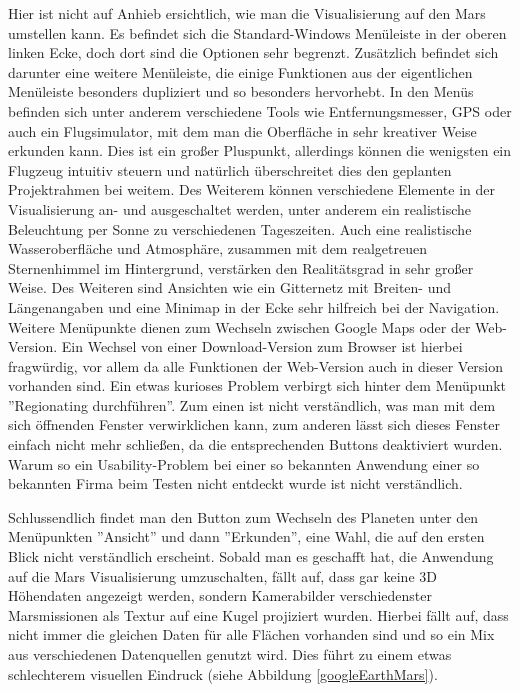 Hier ist nicht auf Anhieb ersichtlich, wie man die Visualisierung auf den Mars umstellen kann. Es befindet sich die Standard-Windows Menüleiste in der oberen linken Ecke, doch dort sind die Optionen sehr begrenzt. Zusätzlich befindet sich darunter eine weitere Menüleiste, die einige Funktionen aus der eigentlichen Menüleiste besonders dupliziert und so besonders hervorhebt. In den Menüs befinden sich unter anderem verschiedene Tools wie Entfernungsmesser, GPS oder auch ein Flugsimulator, mit dem man die Oberfläche in sehr kreativer Weise erkunden kann. Dies ist ein großer Pluspunkt, allerdings können die wenigsten ein Flugzeug intuitiv steuern und natürlich überschreitet dies den geplanten Projektrahmen bei weitem. Des Weiterem können verschiedene Elemente in der Visualisierung an- und ausgeschaltet werden, unter anderem ein realistische Beleuchtung per Sonne zu verschiedenen Tageszeiten. Auch eine realistische Wasseroberfläche und Atmosphäre, zusammen mit dem realgetreuen Sternenhimmel im Hintergrund, verstärken den Realitätsgrad in sehr großer Weise. Des Weiteren sind Ansichten wie ein Gitternetz mit Breiten- und Längenangaben und eine Minimap in der Ecke sehr hilfreich bei der Navigation. Weitere Menüpunkte dienen zum Wechseln zwischen Google Maps oder der Web-Version. Ein Wechsel von einer Download-Version zum Browser ist hierbei fragwürdig, vor allem da alle Funktionen der Web-Version auch in dieser Version vorhanden sind. Ein etwas kurioses Problem verbirgt sich hinter dem Menüpunkt ''Regionating durchführen''. Zum einen ist nicht verständlich, was man mit dem sich öffnenden Fenster verwirklichen kann, zum anderen lässt sich dieses Fenster einfach nicht mehr schließen, da die entsprechenden Buttons deaktiviert wurden. Warum so ein Usability-Problem bei einer so bekannten Anwendung einer so bekannten Firma beim Testen nicht entdeckt wurde ist nicht verständlich.

Schlussendlich findet man den Button zum Wechseln des Planeten unter den Menüpunkten ''Ansicht'' und dann ''Erkunden'', eine Wahl, die auf den ersten Blick nicht verständlich erscheint. Sobald man es geschafft hat, die Anwendung auf die Mars Visualisierung umzuschalten, fällt auf, dass gar keine 3D Höhendaten angezeigt werden, sondern Kamerabilder verschiedenster Marsmissionen als Textur auf eine Kugel projiziert wurden. Hierbei fällt auf, dass nicht immer die gleichen Daten für alle Flächen vorhanden sind und so ein Mix aus verschiedenen Datenquellen genutzt wird. Dies führt zu einem etwas schlechterem visuellen Eindruck (siehe Abbildung \ref{googleEarthMars}).


